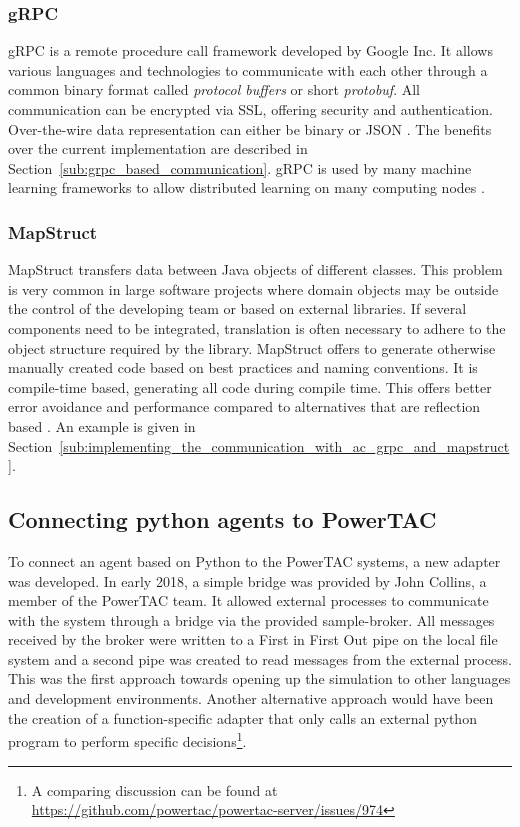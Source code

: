 \subsubsection{\acl{gRPC}}%
\label{sub:grpc}

\acf {gRPC} is a remote procedure call framework developed by Google Inc. It allows various languages and technologies to
communicate with each other through a common binary format called \emph{protocol buffers} or short \emph{protobuf}. All
communication can be encrypted via \ac{SSL}, offering
security and authentication. Over-the-wire data representation can either be binary or \ac{JSON}
\citep[]{grpc}. The benefits over the
current implementation are described in Section~\ref{sub:grpc_based_communication}. \ac{gRPC} is used by many machine learning
frameworks to allow distributed learning on many computing nodes \citep{tensorflow2015-whitepaper}.


\subsubsection{MapStruct}%
\label{sub:mapstruct}

MapStruct transfers data between Java objects of different classes. This problem is very common in large
software projects where domain objects may be outside the control of the developing team or based on external libraries.
If several components need to be integrated, translation is often necessary to adhere to the object structure required
by the library. MapStruct offers to generate otherwise manually created code based on best practices and naming
conventions. It is compile-time based, generating all code during compile time. This offers better error avoidance and
performance compared to alternatives that are reflection based
\citep[]{mapstruct}.
An example is given in Section~\ref{sub:implementing_the_communication_with_ac_grpc_and_mapstruct}.





\subsection{Connecting python agents to PowerTAC}%
\label{sec:connecting_python_agents_to_powertac}



To connect an agent based on Python to the \ac{PowerTAC} systems, a new adapter was developed. In early 2018, a simple bridge
was provided by John Collins, a member of the \ac{PowerTAC} team. It allowed external processes to communicate with the
system through a bridge via the provided sample-broker. All messages received by the broker were written to a First in
First Out pipe on the local file system and a second pipe was created to read messages from the external process. This
was the first approach towards opening up the simulation to other languages and development environments. Another
alternative approach would have been the creation of a function-specific adapter that only calls an external python
program to perform specific decisions\footnote{A comparing discussion can be found at
\url{https://github.com/powertac/powertac-server/issues/974}}.

